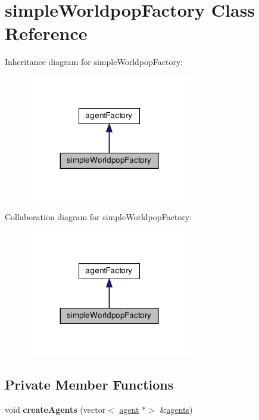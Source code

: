\hypertarget{classsimpleWorldpopFactory}{}\section{simple\+Worldpop\+Factory Class Reference}
\label{classsimpleWorldpopFactory}


Inheritance diagram for simple\+Worldpop\+Factory\+:
\nopagebreak
\begin{figure}[H]
\begin{center}
\leavevmode
\includegraphics[width=203pt]{classsimpleWorldpopFactory__inherit__graph}
\end{center}
\end{figure}


Collaboration diagram for simple\+Worldpop\+Factory\+:
\nopagebreak
\begin{figure}[H]
\begin{center}
\leavevmode
\includegraphics[width=203pt]{classsimpleWorldpopFactory__coll__graph}
\end{center}
\end{figure}
\subsection*{Private Member Functions}
\begin{DoxyCompactItemize}
\item 
\mbox{\label{classsimpleWorldpopFactory_a5093cf767e45d5456f8cac1aba3a4649}} 
void {\bfseries create\+Agents} (vector$<$ \mbox{\hyperlink{classagent}{agent}} $\ast$$>$ \&\mbox{\hyperlink{classagents}{agents}})
\end{DoxyCompactItemize}
